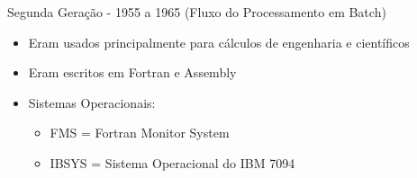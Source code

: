 \documentclass{beamer}
\begin{document}
  \begin{frame}{Segunda Geração - 1955 a 1965 (Fluxo do Processamento em Batch)}
      \begin{itemize}
          \item Eram usados principalmente para cálculos de engenharia e científicos
          \item Eram escritos em Fortran e Assembly
          \item Sistemas Operacionais:
                \begin{itemize}
                    \item FMS = Fortran Monitor System
                    \item IBSYS = Sistema Operacional do IBM 7094
                \end{itemize}
      \end{itemize}
  \end{frame}
  
\end{document}
